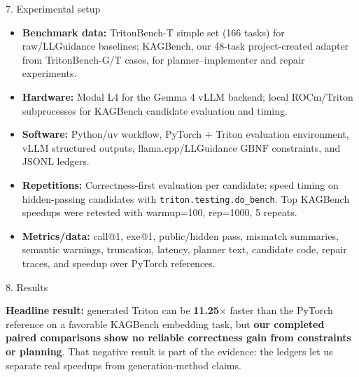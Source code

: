\documentclass[final]{beamer}
\newlength{\colwidth}
\begin{document}
\begin{frame}[t]
\begin{columns}[t]
\begin{column}{\colwidth}
  \begin{exampleblock}{7. Experimental setup}

      \begin{itemize}
      \item \textbf{Benchmark data:} TritonBench-T simple set (166 tasks) for raw/LLGuidance baselines; KAGBench, our 48-task project-created adapter from TritonBench-G/T cases, for planner--implementer and repair experiments.
      \item \textbf{Hardware:} Modal L4 for the Gemma 4 vLLM backend; local ROCm/Triton subprocesses for KAGBench candidate evaluation and timing.
      \item \textbf{Software:} Python/uv workflow, PyTorch + Triton evaluation environment, vLLM structured outputs, llama.cpp/LLGuidance GBNF constraints, and JSONL ledgers.
      \item \textbf{Repetitions:} Correctness-first evaluation per candidate; speed timing on hidden-passing candidates with \texttt{triton.testing.do\_bench}. Top KAGBench speedups were retested with warmup=100, rep=1000, 5 repeats.
      \item \textbf{Metrics/data:} call@1, exe@1, public/hidden pass, mismatch summaries, semantic warnings, truncation, latency, planner text, candidate code, repair traces, and speedup over PyTorch references.
    \end{itemize}

  \end{exampleblock}

  \begin{block}{8. Results}

    \textbf{Headline result:} generated Triton can be \textbf{11.25\(\times\)}
    faster than the PyTorch reference on a favorable KAGBench embedding task, but
    \textbf{our completed paired comparisons show no reliable correctness gain
    from constraints or planning}. That negative result is part of the evidence:
    the ledgers let us separate real speedups from generation-method claims.


\end{block}
\end{column}
\end{columns}
\end{frame}
\end{document}
